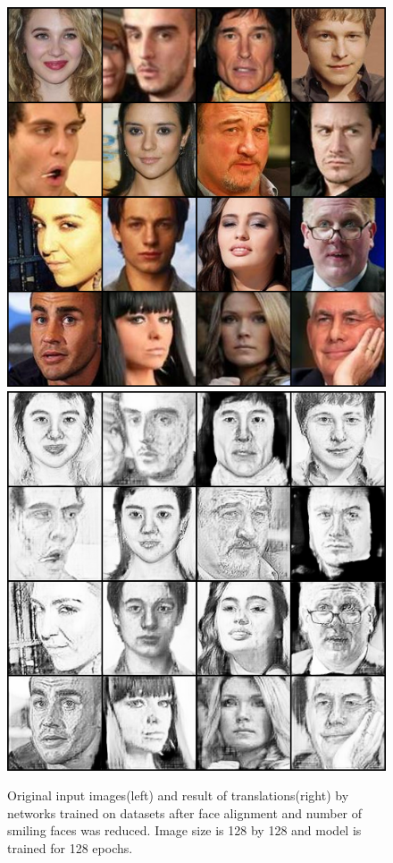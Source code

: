 \begin{figure}[ht]
\begin{center}
    \includegraphics[scale=0.32]{Graphics/pic2ske_origin_final.png}
    \includegraphics[scale=0.32]{Graphics/pic2ske_result_final.png}
    \end{center}
    \caption{Original input images(left) and result of translations(right) by networks trained on datasets after face alignment and number of smiling faces was reduced. Image size is 128 by 128 and model is trained for 128 epochs.}\label{FIG:final}
\end{figure}

